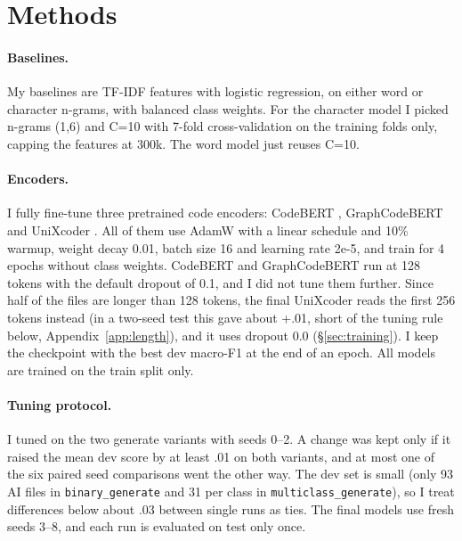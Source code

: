 \documentclass[11pt]{article}
\begin{document}
\section{Methods}
\label{sec:methods}

\paragraph{Baselines.}
My baselines are TF-IDF features with logistic regression, on either word or character n-grams, with balanced class weights. For the character model I picked n-grams (1,6) and C=10 with 7-fold cross-validation on the training folds only, capping the features at 300k. The word model just reuses C=10.

\paragraph{Encoders.}
I fully fine-tune three pretrained code encoders: CodeBERT \citep{feng-etal-2020-codebert}, GraphCodeBERT \citep{guo-etal-2021-graphcodebert} and UniXcoder \citep{guo-etal-2022-unixcoder}. All of them use AdamW with a linear schedule and 10\% warmup, weight decay 0.01, batch size 16 and learning rate 2e-5, and train for 4 epochs without class weights. CodeBERT and GraphCodeBERT run at 128 tokens with the default dropout of 0.1, and I did not tune them further. Since half of the files are longer than 128 tokens, the final UniXcoder reads the first 256 tokens instead (in a two-seed test this gave about +.01, short of the tuning rule below, Appendix~\ref{app:length}), and it uses dropout 0.0 (\S\ref{sec:training}). I keep the checkpoint with the best dev macro-F1 at the end of an epoch. All models are trained on the train split only.

\paragraph{Tuning protocol.}
I tuned on the two generate variants with seeds 0--2. A change was kept only if it raised the mean dev score by at least .01 on both variants, and at most one of the six paired seed comparisons went the other way. The dev set is small (only 93 AI files in \texttt{binary\_generate} and 31 per class in \texttt{multiclass\_generate}), so I treat differences below about .03 between single runs as ties. The final models use fresh seeds 3--8, and each run is evaluated on test only once.
\end{document}
